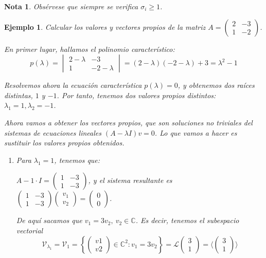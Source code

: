 \documentclass[11pt, a4paper]{article}
\newif\IfInSansMode
\numberwithin{equation}{section}
\newcommand{\pl}{p(\lambda)}
\newcommand{\detm}[4]{%
  \begin{vmatrix} #1 & #2 \\ #3 & #4\end{vmatrix}
}
\theoremstyle{theorem-style}
\theoremstyle{definition-style}
\theoremstyle{remark-style}
\newtheorem*{nota}{Nota}
\theoremstyle{example-style}
\newtheorem{ejemplo}{Ejemplo}[section]
\newenvironment{nlist}
{\begin{enumerate}
    \renewcommand\labelenumi{(\emph{\roman{enumi})}}}
  {\end{enumerate}}
\begin{document}
\begin{nota}
	Obsérvese que siempre se verifica $\sigma_i \ge 1$.
\end{nota}


  \begin{ejemplo} \label{ej2} Calcular los valores y vectores propios de la matriz
    $A =
    \begin{pmatrix}
      2 & -3 \\
      1 & -2
    \end{pmatrix}
    $.
    
    En primer lugar, hallamos el polinomio característico:
    $$ \pl = \detm{2-\lambda}{-3}{1}{-2-\lambda}
    = (2 - \lambda)(-2-\lambda) + 3 = \lambda^2-1$$

    Resolvemos ahora la ecuación característica $p(\lambda) = 0$, y obtenemos dos raíces
    distintas, $1$ y $-1$. Por tanto, tenemos dos valores propios distintos:
    $\lambda_1 = 1, \lambda_2 = -1$.

    Ahora vamos a obtener los vectores propios, que son soluciones no triviales
    del sistemas de ecuaciones lineales $(A - \lambda I)v = 0$. Lo que vamos a hacer es sustituir los valores propios obtenidos.

\begin{nlist}
	
    \item Para $\lambda_1 = 1$, tenemos que:

    $A - 1\cdot I =
    \begin{pmatrix}
      1 & -3 \\
      1 & -3
    \end{pmatrix}$, y el sistema resultante es $
    \begin{pmatrix}
      1 & -3 \\
      1 & -3
    \end{pmatrix}
    \begin{pmatrix}
      v_1 \\
      v_2
    \end{pmatrix} =
    \begin{pmatrix}
      0 \\
      0
    \end{pmatrix}$.
    
    De aquí sacamos que $v_1 = 3v_2,\ v_2 \in \mathbb C$. Es decir, tenemos el subespacio vectorial $$\mathcal V_{\lambda_1} = \mathcal V_1 = \left\{
    \begin{pmatrix}
      v1 \\
      v2
    \end{pmatrix} \in \mathbb C^2 : v_1 = 3v_2 \right\} = \mathscr L
    \begin{pmatrix}
      3 \\
      1
    \end{pmatrix} = \langle
    \begin{pmatrix}
      3 \\
      1
    \end{pmatrix} \rangle$$



\end{nlist}
\end{ejemplo}
\end{document}
